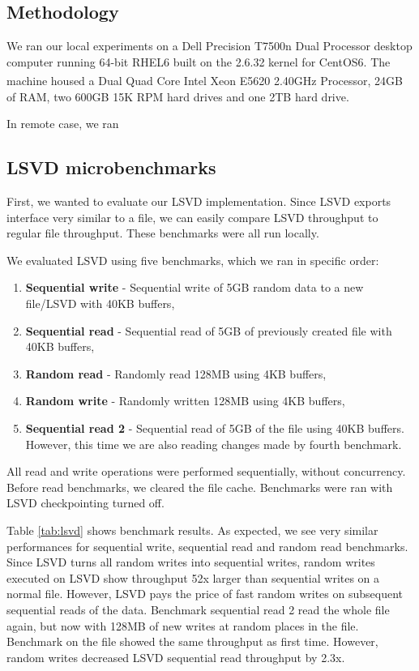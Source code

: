 \subsection{Methodology}
We ran our local experiments on a Dell Precision T7500n Dual Processor desktop 
computer running 64-bit RHEL6 built on the 2.6.32 kernel for CentOS6. The 
machine housed a Dual Quad Core Intel\textsuperscript{\textregistered} 
Xeon\textsuperscript{\textregistered} E5620 2.40GHz Processor, 24GB of RAM, 
two 600GB 15K RPM hard drives and one 2TB hard drive.

In remote case, we ran 

\subsection{LSVD microbenchmarks}
First, we wanted to evaluate our LSVD implementation. Since LSVD exports interface very similar to a file, we can easily compare LSVD throughput to regular file throughput. These benchmarks were all run locally.

We evaluated LSVD using five benchmarks, which we ran in specific order:
\begin{enumerate}
\item \textbf{Sequential write} - Sequential write of 5GB random data to a new file/LSVD with 40KB buffers,
\item \textbf{Sequential read} - Sequential read of 5GB of previously created file with 40KB buffers,
\item \textbf{Random read} - Randomly read 128MB using 4KB buffers,
\item \textbf{Random write} - Randomly written 128MB using 4KB buffers,
\item \textbf{Sequential read 2} - Sequential read of 5GB of the file using 40KB buffers. However, this time we are also reading changes made by fourth benchmark.
\end{enumerate}

All read and write operations were performed sequentially, without concurrency. Before read benchmarks, we cleared the file cache. Benchmarks were ran with LSVD checkpointing turned off.

Table \ref{tab:lsvd} shows benchmark results. As expected, we see very similar performances for sequential write, sequential read and random read benchmarks. Since LSVD turns all random writes into sequential writes, random writes executed on LSVD show throughput 52x larger than sequential writes on a normal file. However, LSVD pays the price of fast random writes on subsequent sequential reads of the data. Benchmark sequential read 2 read the whole file again, but now with 128MB of new writes at random places in the file. Benchmark on the file showed the same throughput as first time. However, random writes decreased LSVD sequential read throughput by 2.3x.


